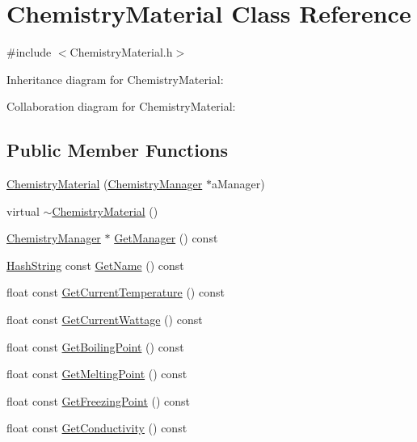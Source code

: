 \hypertarget{classChemistryMaterial}{}\section{Chemistry\+Material Class Reference}
\label{classChemistryMaterial}


{\ttfamily \#include $<$Chemistry\+Material.\+h$>$}



Inheritance diagram for Chemistry\+Material\+:


Collaboration diagram for Chemistry\+Material\+:
\subsection*{Public Member Functions}
\begin{DoxyCompactItemize}
\item 
\hyperlink{classChemistryMaterial_a812f1f68991aac1bbaf701386e19821e}{Chemistry\+Material} (\hyperlink{classChemistryManager}{Chemistry\+Manager} $\ast$a\+Manager)
\item 
virtual \hyperlink{classChemistryMaterial_ad92582e6e4c96ed9eb12874c1cb274f2}{$\sim$\+Chemistry\+Material} ()
\item 
\hyperlink{classChemistryManager}{Chemistry\+Manager} $\ast$ \hyperlink{classChemistryMaterial_a2e897128716848c896e421ec5284e63b}{Get\+Manager} () const 
\item 
\hyperlink{classHashString}{Hash\+String} const \hyperlink{classChemistryMaterial_aec435329d4fd005443539461edfdd61b}{Get\+Name} () const 
\item 
float const \hyperlink{classChemistryMaterial_a21d5b317a95a685c156105007c0a1f23}{Get\+Current\+Temperature} () const 
\item 
float const \hyperlink{classChemistryMaterial_aec7d8dda957f2df913a7caabaf434381}{Get\+Current\+Wattage} () const 
\item 
float const \hyperlink{classChemistryMaterial_a9ef652976b2ab9da968e1133a62c1dce}{Get\+Boiling\+Point} () const 
\item 
float const \hyperlink{classChemistryMaterial_abfc31cee9db843741184f00ce09c1c5b}{Get\+Melting\+Point} () const 
\item 
float const \hyperlink{classChemistryMaterial_a11427696039b8743adc83bc5d1f1a7bd}{Get\+Freezing\+Point} () const 
\item 
float const \hyperlink{classChemistryMaterial_abb17739d660e2ffdba70b9a1bebabdbd}{Get\+Conductivity} () const 

\end{DoxyCompactItemize}
